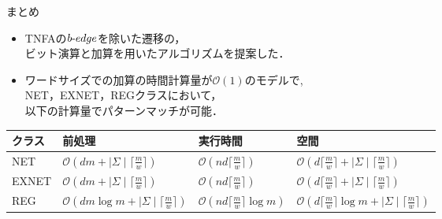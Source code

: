 \documentclass[dvipdfmx,12pt,beamer]{standalone}
\begin{document}
\begin{frame}{まとめ}
  \begin{itemize}
    \item TNFAの$b\mathchar`-edge$を除いた遷移の，\\ビット演算と加算を用いたアルゴリズムを提案した．
    \item ワードサイズでの加算の時間計算量が$\mathcal{O}\left( 1 \right)$のモデルで, \\ 
    \textsf{NET}，\textsf{EXNET}，\textsf{REG}クラスにおいて，\\以下の計算量でパターンマッチが可能．
  \end{itemize}
  \begin{center}
    \scriptsize
    \begin{tabular}{|l|l|l|l|}\hline
      クラス & 前処理 & 実行時間 & 空間 \\\hline
      \textsf{NET} & $\mathcal{O}\left(dm + \mid \Sigma\mid \lceil \frac{m}{w} \rceil \right)$ & $\mathcal{O}\left(nd\lceil \frac{m}{w} \rceil \right)$ & $\mathcal{O}\left(d\lceil \frac{m}{w} \rceil + \mid \Sigma\mid \lceil \frac{m}{w} \rceil \right)$ \\\hline
      \textsf{EXNET} & $\mathcal{O}\left(dm + \mid \Sigma\mid \lceil \frac{m}{w} \rceil \right)$ & $\mathcal{O}\left(nd\lceil \frac{m}{w} \rceil \right)$ & $\mathcal{O}\left(d\lceil \frac{m}{w} \rceil + \mid \Sigma\mid \lceil \frac{m}{w} \rceil \right)$ \\\hline
      \textsf{REG} & $\mathcal{O}\left(dm\log m + \mid \Sigma\mid \lceil \frac{m}{w} \rceil \right)$ & $\mathcal{O}\left(nd\lceil \frac{m}{w} \rceil \log m \right)$ & $\mathcal{O}\left(d\lceil \frac{m}{w} \rceil \log m + \mid \Sigma\mid \lceil \frac{m}{w} \rceil \right)$ \\\hline
    \end{tabular}
  \end{center}
  
\end{frame}
\end{document}

